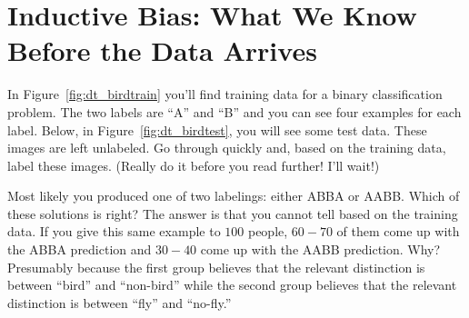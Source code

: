 

\section{Inductive Bias: What We Know Before the Data Arrives}



In Figure~\ref{fig:dt_birdtrain} you'll find training data for a binary
classification problem.  The two labels are ``A'' and ``B'' and you
can see four examples for each label.  Below, in
Figure~\ref{fig:dt_birdtest}, you will see some test data.  These
images are left unlabeled.  Go through quickly and, based on the
training data, label these images.  (Really do it before you read
further!  I'll wait!)

Most likely you produced one of two labelings: either ABBA or AABB. Which of these solutions is right?
The answer is that you cannot tell based on the training data.  If you
give this same example to $100$ people, $60-70$ of them come up with
the ABBA prediction and $30-40$ come up with the AABB prediction.
Why?  Presumably because the first group believes
that the relevant distinction is between ``bird'' and ``non-bird''
while the second group believes that the relevant distinction is
between ``fly'' and ``no-fly.''

